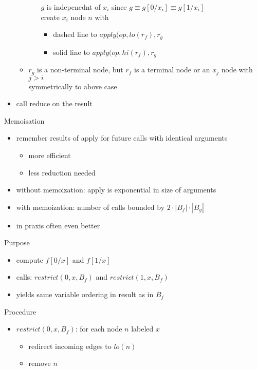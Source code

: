 \documentclass[a4paper, 10pt]{article}
\begin{document}
\begin{mdframed}
\begin{itemize}
\begin{itemize}
\begin{itemize}
            \follows $g$ is indepenednt of $x_i$ since $g\equiv g[0/x_i]\equiv g[1/x_i]$ \\
            \follows create $x_i$ node $n$ with
            \begin{itemize}
                \item dashed line to $apply(op,lo(r_f),r_g$
                \item solid line to $apply(op,hi(r_f),r_g$
            \end{itemize}
        \end{itemize}
        \item $r_g$ is a non-terminal node, but $r_f$ is a terminal node or an $x_j$ node with $j>i$
        \\ \follows symmetrically to above case
    \end{itemize}
    \item call reduce on the result
\end{itemize}
Memoisation
\begin{itemize}
    \item remember results of apply for future calls with identical arguments
    \begin{itemize}
        \item more efficient
        \item less reduction needed
    \end{itemize}
    \item without memoization: apply is exponential in size of arguments
    \item with memoization: number of calls bounded by $2\cdot|B_f|\cdot|B_g|$
    \item in praxis often even better
\end{itemize}
Purpose
\begin{itemize}
    \item compute $f[0/x]$ and $f[1/x]$
    \item calls: $restrict(0,x,B_f)$ and $restrict(1,x,B_f)$
    \item[\follows] yields same variable ordering in result as in $B_f$
\end{itemize}
Procedure
\begin{itemize}
    \item $restrict(0,x,B_f)$: for each node $n$ labeled $x$
    \begin{itemize}
        \item redirect incoming edges to $lo(n)$
        \item remove $n$

\end{itemize}
\end{itemize}
\end{mdframed}
\end{document}
